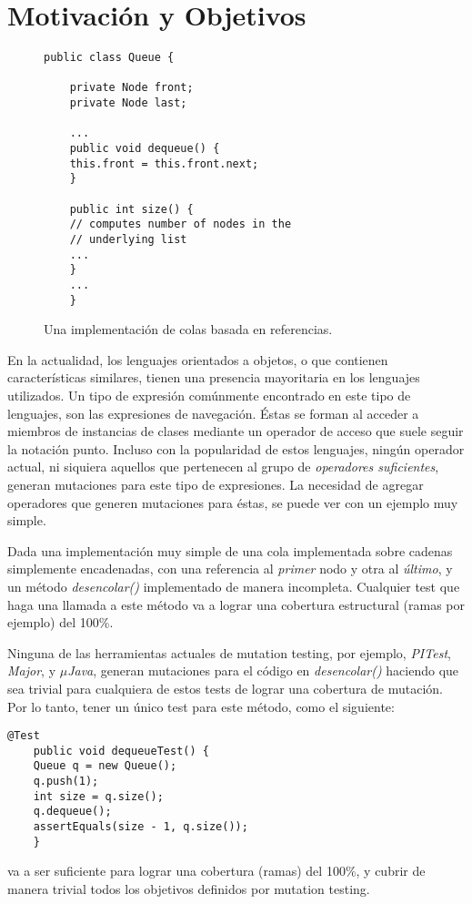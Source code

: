 



\section{Motivaci\'on y Objetivos}
\label{sec:intro.objetivos}

\begin{figure}[t]
	\begin{lstlisting}[frame=tlrb, mathescape=true]
	public class Queue {
	
	private Node front;
	private Node last;
	
	...
	public void dequeue() {
	this.front = this.front.next;
	}
	
	public int size() {
	// computes number of nodes in the 
	// underlying list
	...
	}
	...
	}
	\end{lstlisting}
	\caption{Una implementaci\'on de colas basada en referencias.}
	\label{queue-class}
\end{figure}

En la actualidad, los lenguajes orientados a objetos, o que contienen caracter\'isticas similares, tienen una presencia mayoritaria en los lenguajes utilizados. Un tipo de expresi\'on com\'unmente encontrado en este tipo de lenguajes, son las expresiones de navegaci\'on. \'Estas se forman al acceder a miembros de instancias de clases mediante un operador de acceso que suele seguir la notaci\'on punto. Incluso con la popularidad de estos lenguajes, ning\'un operador actual, ni siquiera aquellos que pertenecen al grupo de \emph{operadores suficientes}, generan mutaciones para este tipo de expresiones. La necesidad de agregar operadores que generen mutaciones para \'estas, se puede ver con un ejemplo muy simple.

Dada una implementaci\'on muy simple de una cola implementada sobre cadenas simplemente encadenadas, con una referencia al \emph{primer} nodo y otra al \emph{\'ultimo}, y un m\'etodo \emph{desencolar()} implementado de manera incompleta. Cualquier test que haga una llamada a este m\'etodo va a lograr una cobertura estructural (ramas por ejemplo) del 100\%.

Ninguna de las herramientas actuales de mutation testing, por ejemplo, \emph{PITest}, \emph{Major}, y \emph{$\mu$Java}, generan mutaciones para el c\'odigo en \emph{desencolar()} haciendo que sea trivial para cualquiera de estos tests de lograr una cobertura de mutaci\'on. Por lo tanto, tener un \'unico test para este m\'etodo, como el siguiente:
\begin{center}
	\begin{lstlisting}[frame=tlrb, mathescape=true]
	@Test
	public void dequeueTest() {
	Queue q = new Queue();
	q.push(1);
	int size = q.size();
	q.dequeue();
	assertEquals(size - 1, q.size());
	}
	\end{lstlisting}
\end{center}
va a ser suficiente para lograr una cobertura (ramas) del 100\%, y cubrir de manera trivial todos los objetivos definidos por mutation testing.

